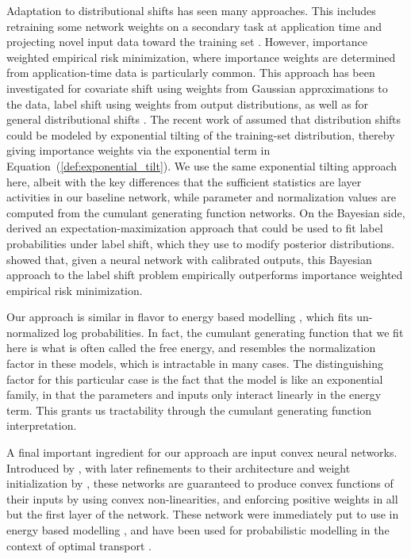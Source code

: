 \documentclass{article}      %
\begin{document}
Adaptation to distributional shifts has seen many approaches.
This includes retraining some network weights on a secondary task at application time \cite{sun_test-time_2020} and projecting novel input data toward the training set \cite{gao_back_2023}.
However, importance weighted empirical risk minimization, where importance weights are determined from application-time data is particularly common.
This approach has been investigated for covariate shift \cite{sugiyama_covariate_2007} using weights from Gaussian approximations to the data, label shift \cite{lipton_detecting_2018,garg_unified_2020} using weights from output distributions, as well as for general distributional shifts \cite{zhang_domain_2013,maity_understanding_2023}.
The recent work of \cite{maity_understanding_2023} assumed that distribution shifts could be modeled by exponential tilting of the training-set distribution, thereby giving importance weights via the exponential term in Equation~(\ref{def:exponential_tilt}).
We use the same exponential tilting approach here, albeit with the key differences that the sufficient statistics are layer activities in our baseline network, while parameter and normalization values are computed from the cumulant generating function networks.
On the Bayesian side, \cite{saerens_adjusting_2002} derived an expectation-maximization approach that could be used to fit label probabilities under label shift, which they use to modify posterior distributions.
\cite{alexandari_maximum_2020} showed that, given a neural network with calibrated outputs, this Bayesian approach to the label shift problem empirically outperforms importance weighted empirical risk minimization.



Our approach is similar in flavor to energy based modelling \cite{lecun_tutorial_2006}, which fits un-normalized log probabilities.
In fact, the cumulant generating function that we fit here is what is often called the free energy, and resembles the normalization factor in these models, which is intractable in many cases.
The distinguishing factor for this particular case is the fact that the model is like an exponential family, in that the parameters and inputs only interact linearly in the energy term.
This grants us tractability through the cumulant generating function interpretation.


A final important ingredient for our approach are input convex neural networks.
Introduced by \cite{amos_input_2017}, with later refinements to their architecture and weight initialization by \cite{hoedt_principled_2023}, these networks are guaranteed to produce convex functions of their inputs by using convex non-linearities, and enforcing positive weights in all but the first layer of the network.
These network were immediately put to use in energy based modelling \cite{amos_input_2017}, and have been used for probabilistic modelling in the context of optimal transport \cite{makkuva_optimal_2020,alvarez-melis_optimizing_2022}.
\end{document}

